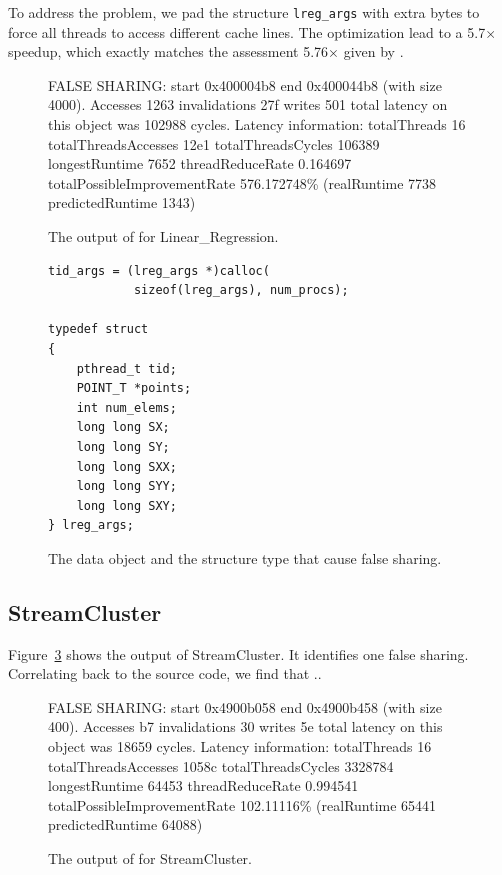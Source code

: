 To address the problem, we pad the structure {\tt lreg\_args} with extra bytes to force all threads to access different cache lines. The optimization lead to a 5.7$\times$ speedup, which exactly matches the assessment 5.76$\times$ given by \cheetah{}.

\begin{figure}
\begin{minipage}{\columnwidth}

\centering

\fbox
{
\begin{minipage}{3in}
FALSE SHARING: start 0x400004b8 end 0x400044b8 (with size 4000). Accesses 1263 invalidations 27f writes 501 total latency on this object was 102988 cycles.
Latency information: totalThreads 16 totalThreadsAccesses 12e1 totalThreadsCycles 106389 longestRuntime 7652 threadReduceRate 0.164697 totalPossibleImprovementRate 576.172748\% (realRuntime 7738 predictedRuntime 1343)
\end{minipage}
}
\vspace{1em}
\caption{The output of \cheetah{} for Linear\_Regression.}
\label{fig:lr}
\end{minipage}
\end{figure}


\begin{figure}
\begin{verbatim}
tid_args = (lreg_args *)calloc(
	        sizeof(lreg_args), num_procs);

typedef struct
{
    pthread_t tid;
    POINT_T *points;
    int num_elems;
    long long SX;
    long long SY;
    long long SXX;
    long long SYY;
    long long SXY;
} lreg_args;	    
\end{verbatim}
\caption{The data object and the structure type that cause false sharing.}
\label{lr:code}
\end{figure}

\subsection{StreamCluster}

Figure~\ref{fig:sc} shows the output of StreamCluster. It identifies one false sharing. Correlating back to the source code, we find that ..

\begin{figure}
\begin{minipage}{\columnwidth}

\centering

\fbox
{
\begin{minipage}{3in}
FALSE SHARING: start 0x4900b058 end 0x4900b458 (with size 400). Accesses b7 invalidations 30 writes 5e total latency on this object was 18659 cycles.
Latency information: totalThreads 16 totalThreadsAccesses 1058c totalThreadsCycles 3328784 longestRuntime 64453 threadReduceRate 0.994541 totalPossibleImprovementRate 102.11116\% (realRuntime 65441 predictedRuntime 64088)
\end{minipage}
}
\vspace{1em}
\caption{The output of \cheetah{} for StreamCluster.}
\label{fig:sc}
\end{minipage}
\end{figure}


